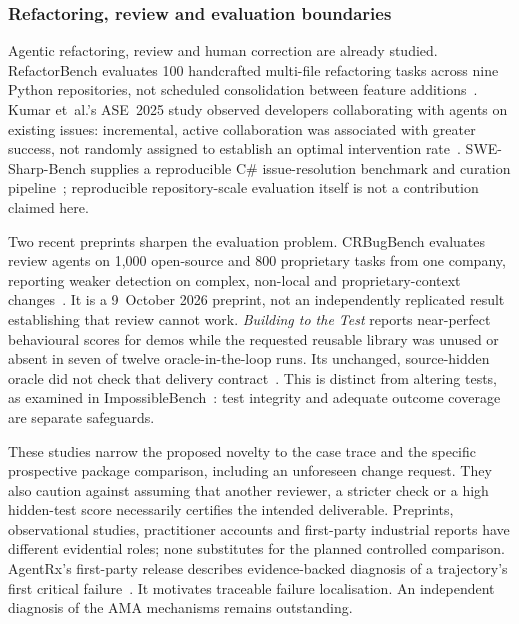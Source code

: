 \subsubsection{Refactoring, review and evaluation boundaries}\label{sup:sec:evaluationwork}

Agentic refactoring, review and human correction are already studied.
RefactorBench evaluates 100 handcrafted multi-file refactoring tasks across
nine Python repositories, not scheduled consolidation between feature
additions~\cite{gautam2025refactorbench}. Kumar et~al.'s ASE~2025 study
observed developers collaborating with agents on existing issues: incremental,
active collaboration was associated with greater success, not randomly
assigned to establish an optimal intervention rate~\cite{kumar2025agents}.
SWE-Sharp-Bench supplies a reproducible C\# issue-resolution benchmark and
curation pipeline~\cite{mhatre2025swesharp}; reproducible repository-scale
evaluation itself is not a contribution claimed here.

Two recent preprints sharpen the evaluation problem. CRBugBench evaluates
review agents on 1,000 open-source and 800 proprietary tasks from one company,
reporting weaker detection on complex, non-local and proprietary-context
changes~\cite{yang2026crbugbench}. It is a 9~October 2026 preprint, not an
independently replicated result establishing that review cannot work.
\emph{Building to the Test} reports near-perfect behavioural scores for demos
while the requested reusable library was unused or absent in seven of
twelve oracle-in-the-loop runs. Its unchanged,
source-hidden oracle did not check that delivery contract~\cite{ma2026building}.
This is distinct from altering tests, as examined in
ImpossibleBench~\cite{zhong2026impossiblebench}: test integrity and adequate
outcome coverage are separate safeguards.

These studies narrow the proposed novelty to the case trace and the specific
prospective package comparison, including an unforeseen change request. They
also caution against assuming that another reviewer, a stricter check or a
high hidden-test score necessarily certifies the intended deliverable.
Preprints, observational
studies, practitioner accounts and first-party industrial reports have different
evidential roles; none substitutes for the planned controlled comparison.
AgentRx's first-party release describes evidence-backed diagnosis of a
trajectory's first critical failure~\cite{microsoft2026agentrx}. It motivates
traceable failure localisation. An independent diagnosis of the AMA mechanisms
remains outstanding.


